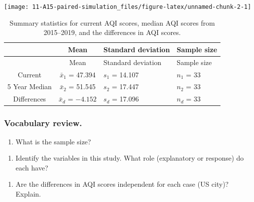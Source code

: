 \documentclass[
]{report}
\providecommand{\tightlist}{%
  \setlength{\itemsep}{0pt}\setlength{\parskip}{0pt}}
\begin{document}
\vspace{.05in}

\begin{center}\texttt{[image: 11-A15-paired-simulation\_files/figure-latex/unnamed-chunk-2-1]} \end{center}

\vspace{.2in}

\begin{longtable}[]{@{}ccll@{}}
\caption{Summary statistics for current AQI scores, median AQI scores from 2015--2019, and the differences in AQI scores.}\tabularnewline
\toprule
& Mean & Standard deviation & Sample size \\
\midrule
\endfirsthead
\toprule
& Mean & Standard deviation & Sample size \\
\midrule
\endhead
Current & \(\bar{x}_1\) = 47.394 & \(s_1\) = 14.107 & \(n_1\) = 33 \\
5 Year Median & \(\bar{x}_2\) = 51.545 & \(s_2\) = 17.447 & \(n_2\) = 33 \\
Differences & \(\bar{x}_d\) = \(-4.152\) & \(s_d\) = 17.096 & \(n_d\) = 33 \\
\bottomrule
\end{longtable}

\newpage

\hypertarget{vocabulary-review.}{%
\subsubsection*{Vocabulary review.}\label{vocabulary-review.}}

\begin{enumerate}
\def\labelenumi{\arabic{enumi}.}
\tightlist
\item
  What is the sample size?
\end{enumerate}

\vspace{0.3in}

\begin{enumerate}
\def\labelenumi{\arabic{enumi}.}
\setcounter{enumi}{1}
\tightlist
\item
  Identify the variables in this study. What role (explanatory or response) do each have?
\end{enumerate}

\vspace{.5in}

\begin{enumerate}
\def\labelenumi{\arabic{enumi}.}
\setcounter{enumi}{2}
\tightlist
\item
  Are the differences in AQI scores independent for each case (US city)? Explain.
\end{enumerate}
\end{document}
